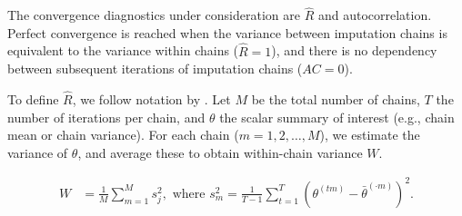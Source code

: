 \documentclass[article]{jss}
\begin{document}
The convergence diagnostics under consideration are $\widehat{R}$ and autocorrelation. Perfect convergence is reached when the variance between imputation chains is equivalent to the variance within chains ($\widehat{R} = 1$), and there is no dependency between subsequent iterations of imputation chains ($AC = 0$). 
%
%
%
%

To define $\widehat{R}$, we follow notation by \cite[p.~5]{veht19}. %
Let $M$ be the total number of chains, $T$ the number of iterations per chain, and $\theta$ the scalar summary of interest (e.g., chain mean or chain variance). For each chain ($m = 1, 2, \dots, M$), we estimate the variance of $\theta$, and average these to obtain within-chain variance $W$.


\begin{align*}
W&=\frac{1}{M} \sum_{m=1}^{M} s_{j}^{2},  \text { where } s_{m}^{2}=\frac{1}{T-1} \sum_{t=1}^{T}\left(\theta^{(t m)}-\bar{\theta}^{(\cdot m)}\right)^{2}. %
\end{align*}
\end{document}
